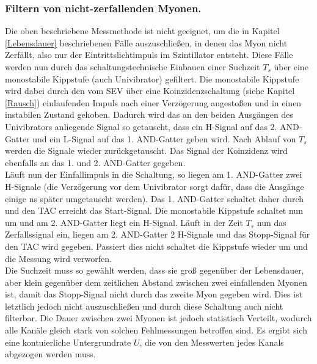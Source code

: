   \subsubsection{Filtern von nicht-zerfallenden Myonen.}
  Die oben beschriebene Messmethode ist nicht geeignet, um die in Kapitel \ref{Lebensdauer}
  beschriebenen Fälle auszuschließen, in denen das Myon nicht Zerfällt, also nur
  der Eintrittslichtimpuls im Szintillator entsteht. Diese Fälle werden nun
  durch das schaltungstechnische Einbauen einer Suchzeit $T_s$ über eine monostabile
  Kippstufe (auch Univibrator) gefiltert. Die monostabile Kippstufe wird dabei durch
  den vom SEV über eine Koinzidenzschaltung (siehe Kapitel \ref{Rausch}) einlaufenden
  Impuls nach einer Verzögerung angestoßen und in einen instabilen Zustand gehoben.
  Dadurch wird das an den beiden Ausgängen des Univibrators anliegende Signal so
  getauscht, dass ein H-Signal auf das 2. AND-Gatter und ein L-Signal auf das 1. AND-Gatter
  geben wird. Nach Ablauf von $T_s$ werden die Signale wieder zurückgetauscht.
  Das Signal der Koinzidenz wird ebenfalls an das 1. und 2. AND-Gatter gegeben.\\
  Läuft nun der Einfallimpuls in die Schaltung, so liegen am 1. AND-Gatter zwei
  H-Signale (die Verzögerung vor dem Univibrator sorgt dafür, dass die Ausgänge einige
  \si{\nano\second} später umgetauscht werden). Das 1. AND-Gatter schaltet daher durch
  und den TAC erreicht das Start-Signal. Die monostabile Kippstufe schaltet nun um
  und am 2. AND-Gatter liegt ein H-Signal. Läuft in der Zeit $T_s$ nun das Zerfallssignal
  ein, liegen am 2. AND-Gatter 2 H-Signale und das Stopp-Signal für den TAC wird gegeben.
  Passiert dies nicht schaltet die Kippstufe wieder um und die Messung wird verworfen.\\
  Die Suchzeit muss so gewählt werden, dass sie groß gegenüber der Lebensdauer, aber klein
  gegenüber dem zeitlichen Abstand zwischen zwei einfallenden Myonen ist, damit das
  Stopp-Signal nicht durch das zweite Myon gegeben wird. Dies ist letztlich jedoch nicht
  auszuschließen und durch diese Schaltung auch nicht filterbar. Die Dauer zwischen
  zwei Myonen ist jedoch statistisch Verteilt, wodurch alle Kanäle gleich stark von
  solchen Fehlmessungen betroffen sind. Es ergibt sich eine kontuierliche Untergrundrate $U$,
  die von den Messwerten jedes Kanals abgezogen werden muss.
